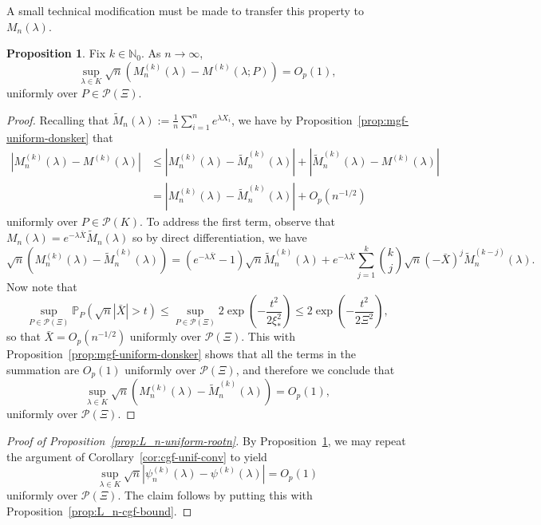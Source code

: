 \documentclass{article}
\theoremstyle{definition}
\newtheorem{proposition}{Proposition}
\newcommand{\N}{\mathbb{N}}
\newcommand{\1}{\mathbbm{1}}
\renewcommand{\P}{\mathbb{P}}
\begin{document}
A small technical modification must be made to transfer this property to $M_n(\lambda)$.
\begin{proposition}
\label{prop:centered-mgf-uniform-donsker}
Fix $k \in \N_0$. As $n \to \infty$, \[
\sup_{\lambda \in K} \sqrt n(M_n^{(k)}(\lambda) - M^{(k)}(\lambda; P)) = O_p(1),
\]
uniformly over $P \in \mathcal P(\Xi)$.
\end{proposition}
\begin{proof}
    Recalling that $\tilde M_n(\lambda) := \frac1n\sum_{i=1}^n e^{\lambda X_i}$, we have by Proposition~\ref{prop:mgf-uniform-donsker} that 
    \begin{align*}
        |M_n^{(k)}(\lambda) - M^{(k)}(\lambda)| &\leq |M_n^{(k)}(\lambda) - \tilde M_n^{(k)}(\lambda)| + |\tilde M_n^{(k)}(\lambda) - M^{(k)}(\lambda)| \\ &= |M_n^{(k)}(\lambda) - \tilde M_n^{(k)}(\lambda)| + O_p(n^{-1/2})
    \end{align*}
    uniformly over $P \in \mathcal P(K)$. To address the first term, observe that $M_n(\lambda) = e^{-\lambda \bar X} \tilde M_n(\lambda)$ so by direct differentiation, we have 
    \[
    \sqrt n(M_n^{(k)}(\lambda) - \tilde M_n^{(k)}(\lambda)) = (e^{-\lambda \bar X} - 1)\sqrt n\tilde M_n^{(k)}(\lambda) + e^{-\lambda \bar X} \sum_{j=1}^k {k \choose j}\sqrt n(-\bar X)^j\tilde M_n^{(k - j)}(\lambda).
    \]
    Now note that 
    \[
    \sup_{P \in \mathcal P(\Xi)}\P_P(\sqrt n|\bar X| > t) \leq \sup_{P \in \mathcal P(\Xi)}2\exp\left(-\frac{t^2}{2\xi_*^2}\right) \leq 2\exp\left(-\frac{t^2}{2\Xi^2}\right),\]
    so that $\bar X = O_p(n^{-1/2})$ uniformly over $\mathcal P(\Xi)$. This with Proposition~\ref{prop:mgf-uniform-donsker} shows that all the terms in the summation are $O_p(1)$ uniformly over $\mathcal P(\Xi)$, and therefore we conclude that 
    \[
     \sup_{\lambda \in K}\sqrt n(M_n^{(k)}(\lambda) - \tilde M_n^{(k)}(\lambda)) = O_p(1),
    \]
    uniformly over $\mathcal P(\Xi)$.
\end{proof}
\begin{proof}[Proof of Proposition~\ref{prop:L_n-uniform-rootn}]
    By Proposition~\ref{prop:centered-mgf-uniform-donsker}, we may repeat the argument of Corollary~\ref{cor:cgf-unif-conv} to yield 
    \[
    \sup_{\lambda \in K} \sqrt n|\psi_n^{(k)}(\lambda) - \psi^{(k)}(\lambda)| = O_p(1)
    \]
    uniformly over $\mathcal P(\Xi)$. 
    The claim follows by putting this with Proposition~\ref{prop:L_n-cgf-bound}. 
\end{proof}
\end{document}
